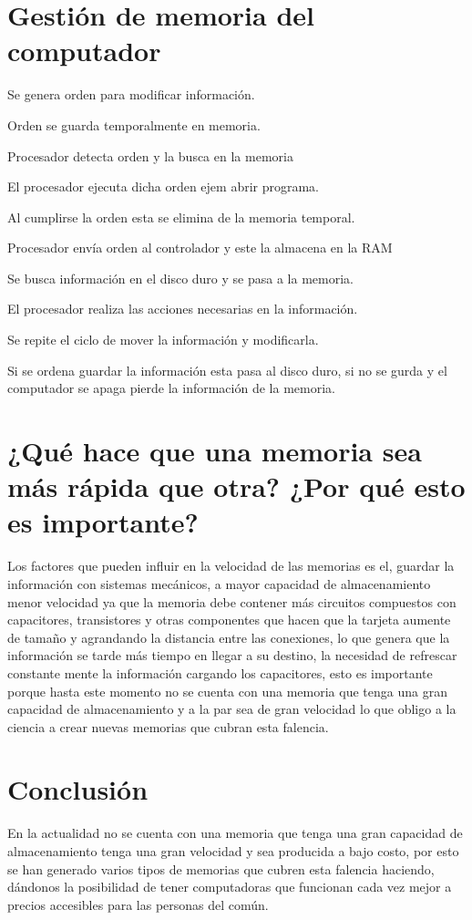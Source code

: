 \documentclass{article}
\begin{document}
\section{Gestión de memoria del computador}



Se genera orden para modificar información.

Orden se guarda temporalmente en memoria.

Procesador detecta orden y la busca en la memoria 

El procesador ejecuta dicha orden ejem abrir programa. 

Al cumplirse la orden esta se elimina de la memoria temporal.

Procesador envía orden al controlador y este la almacena en la RAM

Se busca información en el disco duro y se pasa a la memoria.

El procesador realiza las acciones necesarias en la información. 

Se repite el ciclo de mover la información y modificarla. 

Si se ordena guardar la información esta pasa al disco duro, si no se gurda y el computador se apaga pierde la información de la memoria. 

\section{¿Qué hace que una memoria sea más rápida que otra? ¿Por qué esto es importante?}

Los factores que pueden influir en la velocidad de las memorias es el, guardar la información con sistemas mecánicos, a mayor capacidad de almacenamiento menor velocidad ya que la memoria debe contener más circuitos compuestos con capacitores, transistores y otras componentes que hacen que la tarjeta aumente de tamaño y agrandando   la distancia entre las conexiones, lo que genera que la información se tarde más tiempo en llegar a su destino, la necesidad de refrescar constante mente la información cargando los capacitores, esto es importante porque hasta este momento no se cuenta con una memoria que tenga una gran capacidad de almacenamiento y a la par sea de gran velocidad lo que obligo a la ciencia a crear nuevas memorias que cubran esta falencia. 


\section{Conclusión} \label{conclulsion}

En la actualidad no se cuenta con una memoria que tenga una gran capacidad de almacenamiento tenga una gran velocidad y sea producida a bajo costo, por esto se han generado varios tipos de memorias que cubren esta falencia haciendo, dándonos la posibilidad de tener computadoras que funcionan cada vez mejor a precios accesibles para las personas del común. 



\end{document}
